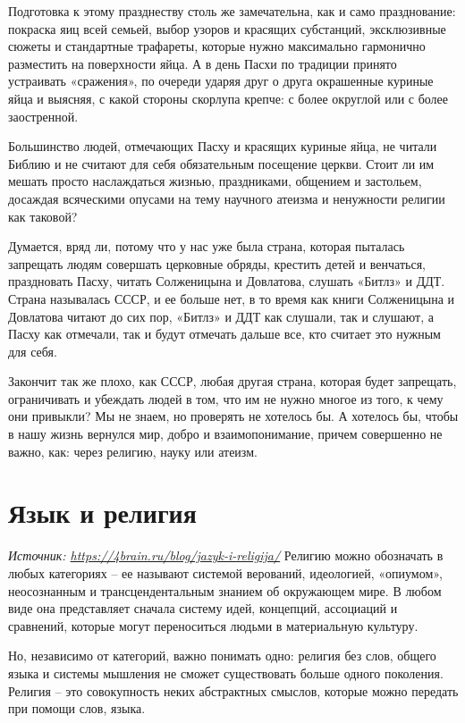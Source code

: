 Подготовка к этому празднеству столь же замечательна, как и само празднование: покраска яиц всей семьей, выбор узоров и красящих субстанций, эксклюзивные сюжеты и стандартные трафареты, которые нужно максимально гармонично разместить на поверхности яйца. А в день Пасхи по традиции принято устраивать «сражения», по очереди ударяя друг о друга окрашенные куриные яйца и выясняя, с какой стороны скорлупа крепче: с более округлой или с более заостренной.

Большинство людей, отмечающих Пасху и красящих куриные яйца, не читали Библию и не считают для себя обязательным посещение церкви. Стоит ли им мешать просто наслаждаться жизнью, праздниками, общением и застольем, досаждая всяческими опусами на тему научного атеизма и ненужности религии как таковой?

Думается, вряд ли, потому что у нас уже была страна, которая пыталась запрещать людям совершать церковные обряды, крестить детей и венчаться, праздновать Пасху, читать Солженицына и Довлатова, слушать «Битлз» и ДДТ. Страна называлась СССР, и ее больше нет, в то время как книги Солженицына и Довлатова читают до сих пор, «Битлз» и ДДТ как слушали, так и слушают, а Пасху как отмечали, так и будут отмечать дальше все, кто считает это нужным для себя.

Закончит так же плохо, как СССР, любая другая страна, которая будет запрещать, ограничивать и убеждать людей в том, что им не нужно многое из того, к чему они привыкли? Мы не знаем, но проверять не хотелось бы. А хотелось бы, чтобы в нашу жизнь вернулся мир, добро и взаимопонимание, причем совершенно не важно, как: через религию, науку или атеизм.

\newpage
\section{Язык и религия}

\textit{Источник: \url{https://4brain.ru/blog/jazyk-i-religija/}}
Религию можно обозначать в любых категориях – ее называют системой верований, идеологией, «опиумом», неосознанным и трансцендентальным знанием об окружающем мире. В любом виде она представляет сначала систему идей, концепций, ассоциаций и сравнений, которые могут переноситься людьми в материальную культуру.

Но, независимо от категорий, важно понимать одно: религия без слов, общего языка и системы мышления не сможет существовать больше одного поколения. Религия – это совокупность неких абстрактных смыслов, которые можно передать при помощи слов, языка.

